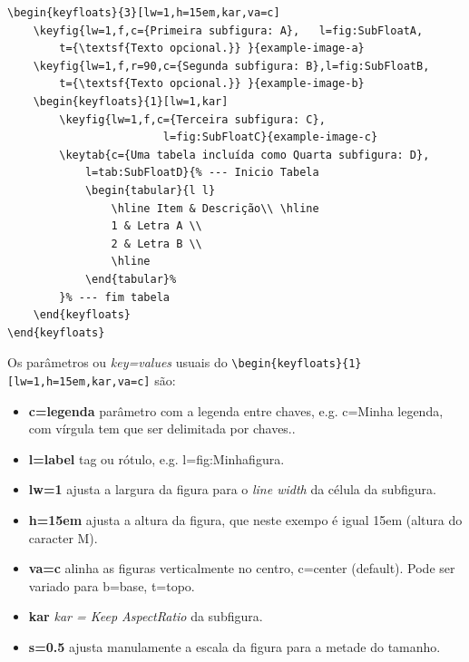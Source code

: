 {\begin{lstlisting}[language={[Latex]Tex},frame=single,numbers =none, caption= {Sintaxe \emph{keyfloats} para inserir um grupo de figuras sem legenda para a figura toda.},label=lst:FigKeyfloat1]
\begin{keyfloats}{3}[lw=1,h=15em,kar,va=c]
	\keyfig{lw=1,f,c={Primeira subfigura: A},	l=fig:SubFloatA,
		t={\textsf{Texto opcional.}} }{example-image-a}
	\keyfig{lw=1,f,r=90,c={Segunda subfigura: B},l=fig:SubFloatB, 
		t={\textsf{Texto opcional.}} }{example-image-b}
	\begin{keyfloats}{1}[lw=1,kar]
		\keyfig{lw=1,f,c={Terceira subfigura: C},
						l=fig:SubFloatC}{example-image-c}
		\keytab{c={Uma tabela incluída como Quarta subfigura: D},
			l=tab:SubFloatD}{% --- Inicio Tabela
			\begin{tabular}{l l} 
				\hline Item & Descrição\\ \hline
				1 & Letra A \\
				2 & Letra B \\
				\hline
			\end{tabular}%
		}% --- fim tabela
	\end{keyfloats}
\end{keyfloats}
\end{lstlisting}

Os parâmetros ou \emph{key=values} usuais do \verb|\begin{keyfloats}{1}[lw=1,h=15em,kar,va=c]| são:
	\begin{itemize}
		\item \textbf{c={legenda}} parâmetro com a legenda entre chaves, e.g. c={Minha legenda, com vírgula tem que ser delimitada por chaves.}.
		\item \textbf{l=label}  tag ou rótulo, e.g. l=fig:Minhafigura.
		\item \textbf{lw=1} ajusta a largura da figura para o \emph{line width} da célula da subfigura.
		\item \textbf{h=15em} ajusta a altura da figura, que neste exempo é igual 15em (altura do caracter M).
		\item \textbf{va=c} alinha as figuras verticalmente no centro, c=center (default). Pode ser variado para b=base, t=topo.
		\item \textbf{kar} \emph{kar = Keep AspectRatio} da subfigura.
		\item \textbf{s=0.5} ajusta manulamente a escala da figura para a metade do tamanho.
	\end{itemize}
	
}
